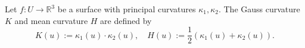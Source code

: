 Let $f: U \to \mathbb{R}^3$ be a surface with principal curvatures $\kappa_1, \kappa_2$. The Gauss curvature $K$ and mean curvature $H$ are defined by
$$K(u) := \kappa_1(u) \cdot \kappa_2(u), \quad H(u) := \frac{1}{2}(\kappa_1(u) + \kappa_2(u)).$$